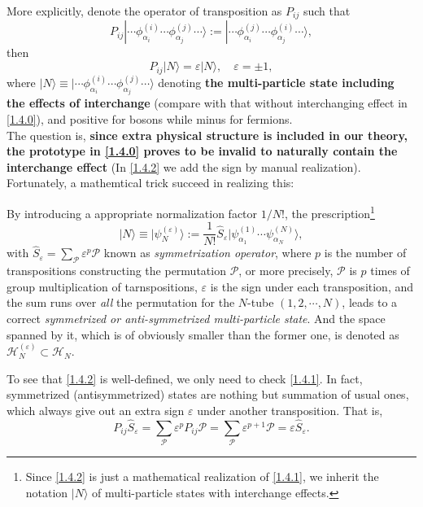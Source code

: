 \documentclass[b5paper,10pt,UTF8]{book}
\numberwithin{equation}{section}
\begin{document}
		More explicitly, denote the operator of transposition as $P_{ij}$ such that
		$$P_{ij}|\cdots\phi_{\alpha_i}^{(i)}\cdots\phi_{\alpha_j}^{(j)}\cdots\rangle:=|\cdots\phi_{\alpha_i}^{(j)}\cdots\phi_{\alpha_j}^{(i)}\cdots\rangle,$$
		then 
		\begin{equation}\label{1.4.1}
			P_{ij}|N\rangle=\varepsilon|N\rangle,\quad\varepsilon=\pm1,
		\end{equation}
		where $|N\rangle\equiv|\cdots\phi_{\alpha_i}^{(i)}\cdots\phi_{\alpha_j}^{(j)}\cdots\rangle$ denoting \textbf{the multi-particle state including the effects of interchange} (compare with that without interchanging effect in \eqref{1.4.0}), and positive for bosons while minus for fermions.\\
 		\indent The question is, \textbf{since extra physical structure is included in our theory, the prototype in \eqref{1.4.0} proves to be invalid to naturally contain the interchange effect} (In \eqref{1.4.2} we add the sign by manual realization). Fortunately, a mathemtical trick succeed in realizing this:
 		\begin{Def}
 			By introducing a appropriate normalization factor $1/N!$, the prescription\footnote{Since \eqref{1.4.2} is just a mathematical realization of \eqref{1.4.1}, we inherit the notation $|N\rangle$ of multi-particle states with interchange effects.} 
 			\begin{equation}\label{1.4.2}
 				|N\rangle\equiv|\psi^{(\varepsilon)}_N\rangle:=\dfrac{1}{N!}\hat{S}_\varepsilon|\psi_{\alpha_1}^{(1)}\cdots\psi_{\alpha_N}^{(N)}\rangle,
 			\end{equation}
 			with $\displaystyle\hat{S}_{\varepsilon}=\sum_\mathcal{P}\varepsilon^p\mathcal{P}$ known as \emph{symmetrization operator}, where $p$ is the number of transpositions constructing the permutation $\mathcal{P}$, or more precisely, $\mathcal{P}$ is $p$ times of group multiplication of tarnspositions, $\varepsilon$ is the sign under each transposition, and the sum runs over \emph{all} the permutation for the $N$-tube $(1,2,\cdots,N)$, leads to a correct \emph{symmetrized or anti-symmetrized multi-particle state}. And the space spanned by it, which is of obviously smaller than the former one, is denoted as $\mathcal{H}_N^{(\varepsilon)}\subset\mathcal{H}_N$.
 		\end{Def}
 		To see that \eqref{1.4.2} is well-defined, we only need to check \eqref{1.4.1}. In fact, symmetrized (antisymmetrized) states are nothing but summation of usual ones, which always give out an extra sign $\varepsilon$ under another transposition. That is,
 		$$P_{ij}\hat{S}_\varepsilon=\sum_{\mathcal{P}}\varepsilon^p P_{ij}\mathcal{P}=\sum_{\mathcal{P}}\varepsilon^{p+1}\mathcal{P}=\varepsilon\hat{S}_\varepsilon.$$
 		
\end{document}
